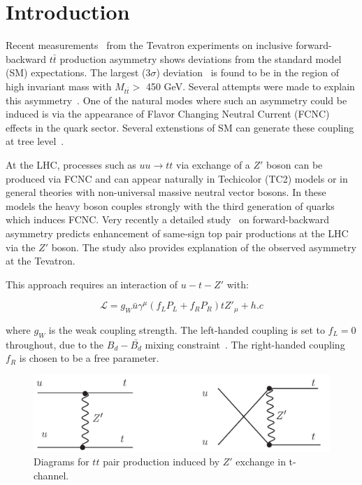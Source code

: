 \section{Introduction}
\label{sec:intro}

Recent measurements~\cite{d0:fwtop, cdf:fwtop1, cdf:fwtop2} from the Tevatron experiments on inclusive forward-backward 
$t\bar{t}$ production asymmetry shows deviations from the standard model (SM) expectations.
The largest (3$\sigma$) deviation~\cite{cdf:fwtop2} is found to be in the region of high invariant mass
with $M_{t\bar{t}} > $ 450 GeV. Several attempts were made to explain this asymmetry~\cite{berger, Buckley, Gresham, zoltan}. 
One of the natural modes where such an asymmetry could be induced is via the appearance of Flavor 
Changing Neutral Current (FCNC) effects in the quark sector. Several extenstions of SM 
can generate these coupling at tree level~\cite{hills, others1}.

At the LHC, processes such as $u u \rightarrow t t$ via exchange of a $Z'$ boson
can be produced via FCNC and can appear naturally in Techicolor (TC2) models or in 
general theories with non-universal massive neutral vector bosons. In these models
the heavy boson couples strongly with the third generation of quarks which induces FCNC. 
Very recently a detailed study~\cite{berger} on forward-backward asymmetry predicts  
enhancement of same-sign top pair productions at the LHC via the $Z'$ boson. The study also 
provides explanation of the observed asymmetry at the Tevatron. 

This approach requires an interaction of $u-t-Z'$ with:

\begin{equation}
  \mathcal{L} = g_W \bar{u} \gamma^\mu (f_L P_L + f_R P_R)tZ'_\mu + h.c
\end{equation}

where $g_W$ is the weak coupling strength. The left-handed coupling is set to $f_L = 0$ throughout, due 
to the $B_d-\bar{B_d}$ mixing constraint~\cite{Cao}. The right-handed coupling $f_R$ is chosen to be a free parameter. 

\begin{figure}[htb]
\begin{center}
\includegraphics[width=0.7\linewidth, height=0.2\linewidth]{figs/sstop1.pdf}
\caption{ Diagrams for $tt$ pair production induced by $Z'$ exchange in t-channel. \label{fig:tchannel}}
\end{center}
\end{figure}

